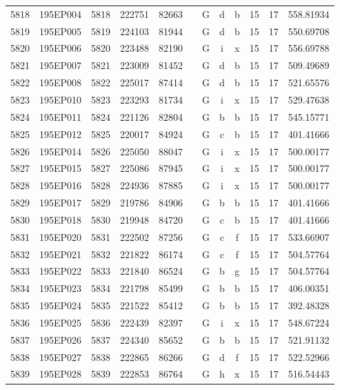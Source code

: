 \begin{tabular}{|*{12}{c|}}
5818 & 195EP004 & 5818 & 222751 & 82663 &  & G & d & b & 15 & 17 & 558.81934 \\ 
5819 & 195EP005 & 5819 & 224103 & 81944 &  & G & d & b & 15 & 17 & 550.69708 \\ 
5820 & 195EP006 & 5820 & 223488 & 82190 &  & G & i & x & 15 & 17 & 556.69788 \\ 
5821 & 195EP007 & 5821 & 223009 & 81452 &  & G & d & b & 15 & 17 & 509.49689 \\ 
5822 & 195EP008 & 5822 & 225017 & 87414 &  & G & d & b & 15 & 17 & 521.65576 \\ 
5823 & 195EP010 & 5823 & 223293 & 81734 &  & G & i & x & 15 & 17 & 529.47638 \\ 
5824 & 195EP011 & 5824 & 221126 & 82804 &  & G & b & b & 15 & 17 & 545.15771 \\ 
5825 & 195EP012 & 5825 & 220017 & 84924 &  & G & c & b & 15 & 17 & 401.41666 \\ 
5826 & 195EP014 & 5826 & 225050 & 88047 &  & G & i & x & 15 & 17 & 500.00177 \\ 
5827 & 195EP015 & 5827 & 225086 & 87945 &  & G & i & x & 15 & 17 & 500.00177 \\ 
5828 & 195EP016 & 5828 & 224936 & 87885 &  & G & i & x & 15 & 17 & 500.00177 \\ 
5829 & 195EP017 & 5829 & 219786 & 84906 &  & G & b & b & 15 & 17 & 401.41666 \\ 
5830 & 195EP018 & 5830 & 219948 & 84720 &  & G & c & b & 15 & 17 & 401.41666 \\ 
5831 & 195EP020 & 5831 & 222502 & 87256 &  & G & c & f & 15 & 17 & 533.66907 \\ 
5832 & 195EP021 & 5832 & 221822 & 86174 &  & G & c & f & 15 & 17 & 504.57764 \\ 
5833 & 195EP022 & 5833 & 221840 & 86524 &  & G & b & g & 15 & 17 & 504.57764 \\ 
5834 & 195EP023 & 5834 & 221798 & 85499 &  & G & b & b & 15 & 17 & 406.00351 \\ 
5835 & 195EP024 & 5835 & 221522 & 85412 &  & G & b & b & 15 & 17 & 392.48328 \\ 
5836 & 195EP025 & 5836 & 222439 & 82397 &  & G & i & x & 15 & 17 & 548.67224 \\ 
5837 & 195EP026 & 5837 & 224340 & 85652 &  & G & b & b & 15 & 17 & 521.91132 \\ 
5838 & 195EP027 & 5838 & 222865 & 86266 &  & G & d & f & 15 & 17 & 522.52966 \\ 
5839 & 195EP028 & 5839 & 222853 & 86764 &  & G & h & x & 15 & 17 & 516.54443 \\ 

\end{tabular}
